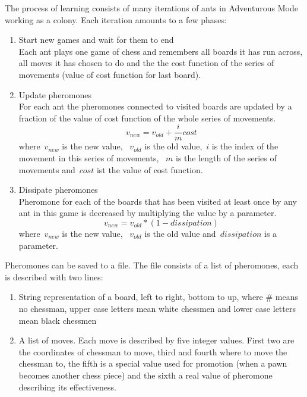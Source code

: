 \documentclass[pdftex]{article}
\begin{document}
The process of learning consists of many iterations of ants in Adventurous Mode working as a colony. Each iteration amounts to a few phases:
\begin{enumerate}
 	\item Start new games and wait for them to end \hfill \\
		Each ant plays one game of chess and remembers all boards it has run across, all moves it has chosen to do and the
the cost function of the series of movements (value of cost function for last board).
	\item Update pheromones \hfill \\
		For each ant the pheromones connected to visited boards are updated by a fraction of the value of cost function of the whole series of movements.
\begin{equation}
	v_{new} = v_{old} + \frac{i}{m} cost
\end{equation}
where~$v_{new}$ is the new value, ~$v_{old}$ is the old value,~$i$ is the index of the movement in this series of movements, ~$m$ is the length of the series of movements and~$cost$ ist the value of cost function.
	\item Dissipate pheromones \hfill \\
		Pheromone for each of the boards that has been visited at least once by any ant in this game is decreased by multiplying the value by a parameter.
\begin{equation}
\label{eq:dissipationequation}
	v_{new} =  v_{old} *  (1 - dissipation)
\end{equation}
where~$v_{new}$ is the new value, ~$v_{old}$ is the old value and~$dissipation$ is a parameter. 

\end{enumerate}

Pheromones can be saved to a file. The file consists of a list of pheromones, each is described with two lines:
\begin{enumerate}
 	\item String representation of a board, left to right, bottom to up, where \# means no chessman, upper case letters mean white chessmen and lower case letters mean black chessmen \hfill \\
	\item A list of moves. Each move is described by five integer values. First two are the coordinates of chessman to move, third and fourth where to move the chessman to, the fifth is a special value used for promotion (when a pawn becomes another chess piece) and the sixth a real value of pheromone describing its effectiveness. \hfill \\
\end{enumerate}
\end{document}
